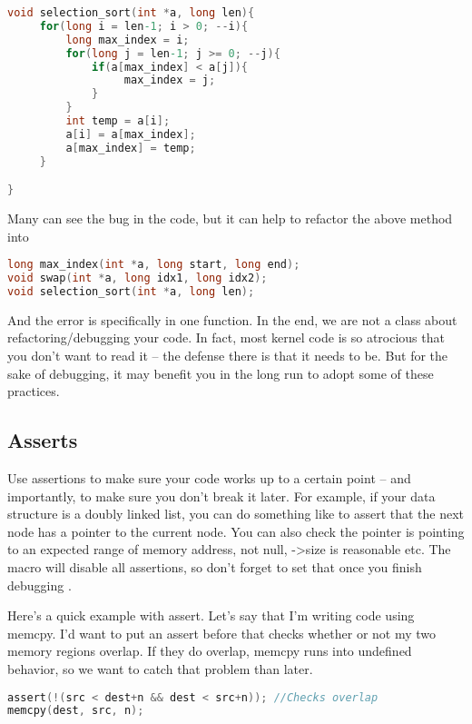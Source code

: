 \begin{lstlisting}[language=C]
void selection_sort(int *a, long len){
     for(long i = len-1; i > 0; --i){
         long max_index = i;
         for(long j = len-1; j >= 0; --j){
             if(a[max_index] < a[j]){
                  max_index = j;
             }
         }
         int temp = a[i];
         a[i] = a[max_index];
         a[max_index] = temp;
     }

}
\end{lstlisting}

Many can see the bug in the code, but it can help to refactor the above method into

\begin{lstlisting}[language=C]
long max_index(int *a, long start, long end);
void swap(int *a, long idx1, long idx2);
void selection_sort(int *a, long len);
\end{lstlisting}

And the error is specifically in one function.
In the end, we are not a class about refactoring/debugging your code.
In fact, most kernel code is so atrocious that you don't want to read it -- the defense there is that it needs to be.
But for the sake of debugging, it may benefit you in the long run to adopt some of these practices.

\subsection{Asserts}

Use assertions to make sure your code works up to a certain point -- and importantly, to make sure you don't break it later.
For example, if your data structure is a doubly linked list, you can do something like  to assert that the next node has a pointer to the current node.
You can also check the pointer is pointing to an expected range of memory address, not null, -\textgreater{}size is reasonable etc.
The  macro will disable all assertions, so don't forget to set that once you finish debugging \cite{cplusplus_assert}.

Here's a quick example with assert. Let's say that I'm writing code using memcpy. I'd want to put an assert before that checks whether or not my two memory regions overlap.
If they do overlap, memcpy runs into undefined behavior, so we want to catch that problem than later.

\begin{lstlisting}[language=C]
assert(!(src < dest+n && dest < src+n)); //Checks overlap
memcpy(dest, src, n);
\end{lstlisting}

